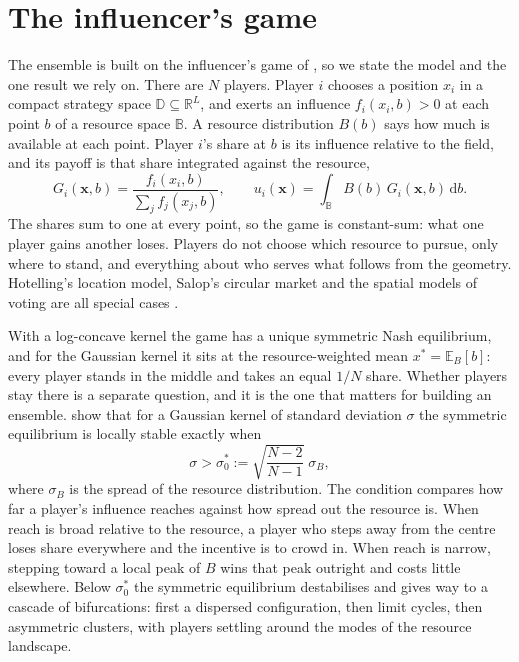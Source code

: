 \documentclass{article}
\begin{document}
\section{The influencer's game}
\label{sec:game}
The ensemble is built on the influencer's game of \citet{lovett2026influencer}, so we state the model
and the one result we rely on. There are $N$ players. Player $i$ chooses a position $x_i$ in a
compact strategy space $\mathbb{D} \subseteq \mathbb{R}^L$, and exerts an influence $f_i(x_i, b) > 0$
at each point $b$ of a resource space $\mathbb{B}$. A resource distribution $B(b)$ says how much is
available at each point. Player $i$'s share at $b$ is its influence relative to the field, and its
payoff is that share integrated against the resource,
\begin{equation}
G_i(\mathbf{x}, b) = \frac{f_i(x_i, b)}{\sum_j f_j(x_j, b)}, \qquad
u_i(\mathbf{x}) = \int_{\mathbb{B}} B(b)\, G_i(\mathbf{x}, b)\, \mathrm{d}b .
\label{eq:game}
\end{equation}
The shares sum to one at every point, so the game is constant-sum: what one player gains another
loses. Players do not choose which resource to pursue, only where to stand, and everything about who
serves what follows from the geometry. Hotelling's location model, Salop's circular market and the
spatial models of voting are all special cases \citep{hotelling1929stability,salop1979monopolistic,downs1957economic}.

With a log-concave kernel the game has a unique symmetric Nash equilibrium, and for the Gaussian
kernel it sits at the resource-weighted mean $x^* = \mathbb{E}_B[b]$: every player stands in the
middle and takes an equal $1/N$ share. Whether players stay there is a separate question, and it is
the one that matters for building an ensemble. \citet{lovett2026influencer} show that for a Gaussian
kernel of standard deviation $\sigma$ the symmetric equilibrium is locally stable exactly when
\begin{equation}
\sigma > \sigma_0^* := \sqrt{\frac{N-2}{N-1}}\;\sigma_B,
\label{eq:threshold}
\end{equation}
where $\sigma_B$ is the spread of the resource distribution. The condition compares how far a
player's influence reaches against how spread out the resource is. When reach is broad relative to
the resource, a player who steps away from the centre loses share everywhere and the incentive is to
crowd in. When reach is narrow, stepping toward a local peak of $B$ wins that peak outright and
costs little elsewhere. Below $\sigma_0^*$ the symmetric equilibrium destabilises and gives way to a
cascade of bifurcations: first a dispersed configuration, then limit cycles, then asymmetric
clusters, with players settling around the modes of the resource landscape.
\end{document}
